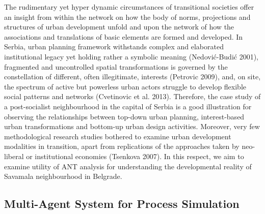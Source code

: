 \documentclass[11pt]{report}
\begin{document}
The rudimentary yet hyper dynamic circumstances of transitional societies offer an insight from within the network on how the body of norms, projections and structures of urban development unfold and upon the network of how the associations and translations of basic elements are formed and developed. In Serbia, urban planning framework withstands complex and elaborated institutional legacy yet holding rather a symbolic meaning (Nedović-Budić 2001), fragmented and uncontrolled spatial transformations is governed by the constellation of different, often illegitimate, interests (Petrovic 2009), and, on site, the spectrum of active but powerless urban actors struggle to develop flexible social patterns and networks (Cvetinovic et al. 2013). Therefore, the case study of a post-socialist neighbourhood in the capital of Serbia is a good illustration for observing the relationships between top-down urban planning, interest-based urban transformations and bottom-up urban design activities. Moreover, very few methodological research studies bothered to examine urban  development modalities  in  transition,  apart  from  replications  of  the  approaches  taken  by  neo-liberal  or institutional economies (Tsenkova 2007). In this respect, we aim to examine utility of ANT analysis for understanding the developmental reality of Savamala neighbourhood in Belgrade.

\subsection{Multi-Agent System for Process Simulation}
\end{document}
